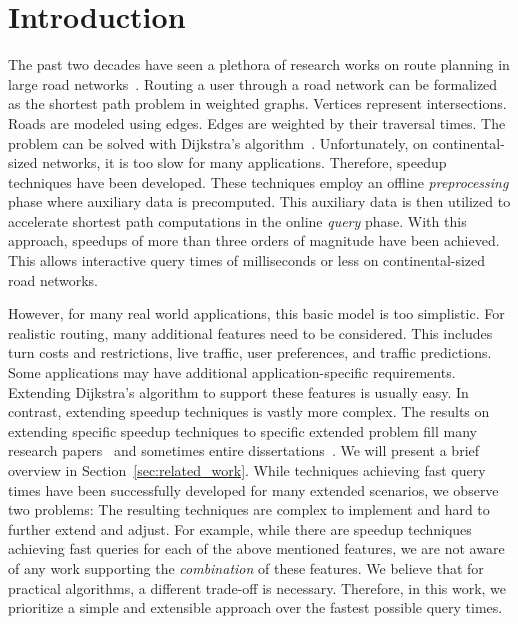 \documentclass[manuscript,review]{acmart}
\begin{document}


\maketitle

\section{Introduction}
\label{sec:intro}
The past two decades have seen a plethora of research works on route planning in large road networks~\cite{bdgmpsww-rptn-16}.
Routing a user through a road network can be formalized as the shortest path problem in weighted graphs.
Vertices represent intersections.
Roads are modeled using edges.
Edges are weighted by their traversal times.
The problem can be solved with Dijkstra's algorithm~\cite{d-ntpcg-59}.
Unfortunately, on continental-sized networks, it is too slow for many applications.
Therefore, speedup techniques have been developed.
These techniques employ an offline \emph{preprocessing} phase where auxiliary data is precomputed.
This auxiliary data is then utilized to accelerate shortest path computations in the online \emph{query} phase.
With this approach, speedups of more than three orders of magnitude have been achieved.
This allows interactive query times of milliseconds or less on continental-sized road networks.

However, for many real world applications, this basic model is too simplistic.
For realistic routing, many additional features need to be considered.
This includes turn costs and restrictions, live traffic, user preferences, and traffic predictions.
Some applications may have additional application-specific requirements.
Extending Dijkstra's algorithm to support these features is usually easy.
In contrast, extending speedup techniques is vastly more complex.
The results on extending specific speedup techniques to specific extended problem fill many research papers~\cite{gv-errnt-11,dgpw-crprn-13,dsw-cch-15,bwzz-cchtc-20,bgsv-mtdtt-13,swz-sfert-21} and sometimes entire dissertations~\cite{Delling2009_1000011046,b-tdrpc-14,Baum2018_1000082225}.
We will present a brief overview in Section~\ref{sec:related_work}.
While techniques achieving fast query times have been successfully developed for many extended scenarios, we observe two problems:
The resulting techniques are complex to implement and hard to further extend and adjust.
For example, while there are speedup techniques achieving fast queries for each of the above mentioned features, we are not aware of any work supporting the \emph{combination} of these features.
We believe that for practical algorithms, a different trade-off is necessary.
Therefore, in this work, we prioritize a simple and extensible approach over the fastest possible query times.
\end{document}

